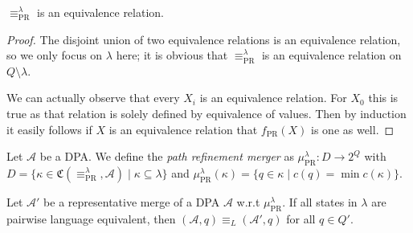 \vspace{5pt}

\begin{lem}
	$\equiv_\text{PR}^\lambda$ is an equivalence relation.
\end{lem}

\begin{proof}
	The disjoint union of two equivalence relations is an equivalence relation, so we only focus on $\lambda$ here; it is obvious that $\equiv_\text{PR}^\lambda$ is an equivalence relation on $Q \setminus \lambda$.
	
	We can actually observe that every $X_i$ is an equivalence relation. For $X_0$ this is true as that relation is solely defined by equivalence of values. Then by induction it easily follows if $X$ is an equivalence relation that $f_\text{PR}(X)$ is one as well.
\end{proof}

\begin{defn}
	Let $\mathcal{A}$ be a DPA. We define the \emph{path refinement merger} as $\mu_\text{PR}^\lambda : D \rightarrow 2^Q$ with $D = \{ \kappa \in \mathfrak{C}(\equiv_\text{PR}^\lambda, \mathcal{A}) \mid \kappa \subseteq \lambda \}$ and $\mu_\text{PR}^\lambda(\kappa) = \{ q \in \kappa \mid c(q) = \min c(\kappa) \}$.
\end{defn}

\vspace{10pt}

\begin{theorem}
	Let $\mathcal{A}'$ be a representative merge of a DPA $\mathcal{A}$ w.r.t $\mu_\text{PR}^\lambda$. If all states in $\lambda$ are pairwise language equivalent, then $(\mathcal{A}, q) \equiv_L (\mathcal{A}', q)$ for all $q \in Q'$.
	\label{thm:pr:preserves_language}
\end{theorem}

